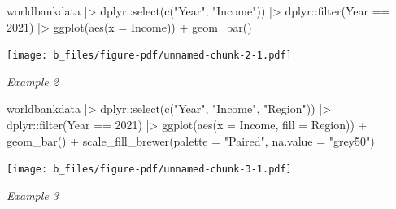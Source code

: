 \documentclass[
  letterpaper,
  DIV=11,
  numbers=noendperiod]{scrreprt}
\newenvironment{Shaded}{\begin{snugshade}}{\end{snugshade}}
\newcommand{\AttributeTok}[1]{\textcolor[rgb]{0.40,0.45,0.13}{#1}}
\newcommand{\DecValTok}[1]{\textcolor[rgb]{0.68,0.00,0.00}{#1}}
\newcommand{\FunctionTok}[1]{\textcolor[rgb]{0.28,0.35,0.67}{#1}}
\newcommand{\NormalTok}[1]{\textcolor[rgb]{0.00,0.23,0.31}{#1}}
\newcommand{\SpecialCharTok}[1]{\textcolor[rgb]{0.37,0.37,0.37}{#1}}
\newcommand{\StringTok}[1]{\textcolor[rgb]{0.13,0.47,0.30}{#1}}
\begin{document}
\begin{Shaded}
\begin{Highlighting}[]
\NormalTok{worldbankdata }\SpecialCharTok{|\textgreater{}}
\NormalTok{  dplyr}\SpecialCharTok{::}\FunctionTok{select}\NormalTok{(}\FunctionTok{c}\NormalTok{(}\StringTok{"Year"}\NormalTok{, }\StringTok{"Income"}\NormalTok{)) }\SpecialCharTok{|\textgreater{}}
\NormalTok{  dplyr}\SpecialCharTok{::}\FunctionTok{filter}\NormalTok{(Year }\SpecialCharTok{==} \DecValTok{2021}\NormalTok{) }\SpecialCharTok{|\textgreater{}}
  \FunctionTok{ggplot}\NormalTok{(}\FunctionTok{aes}\NormalTok{(}\AttributeTok{x =}\NormalTok{ Income)) }\SpecialCharTok{+}
  \FunctionTok{geom\_bar}\NormalTok{()}
\end{Highlighting}
\end{Shaded}

\texttt{[image: b\_files/figure-pdf/unnamed-chunk-2-1.pdf]}

\emph{Example 2}

\begin{Shaded}
\begin{Highlighting}[]
\NormalTok{worldbankdata }\SpecialCharTok{|\textgreater{}}
\NormalTok{  dplyr}\SpecialCharTok{::}\FunctionTok{select}\NormalTok{(}\FunctionTok{c}\NormalTok{(}\StringTok{"Year"}\NormalTok{, }\StringTok{"Income"}\NormalTok{, }\StringTok{"Region"}\NormalTok{)) }\SpecialCharTok{|\textgreater{}}
\NormalTok{  dplyr}\SpecialCharTok{::}\FunctionTok{filter}\NormalTok{(Year }\SpecialCharTok{==} \DecValTok{2021}\NormalTok{) }\SpecialCharTok{|\textgreater{}}
  \FunctionTok{ggplot}\NormalTok{(}\FunctionTok{aes}\NormalTok{(}\AttributeTok{x =}\NormalTok{ Income, }\AttributeTok{fill =}\NormalTok{ Region)) }\SpecialCharTok{+}
  \FunctionTok{geom\_bar}\NormalTok{() }\SpecialCharTok{+}
  \FunctionTok{scale\_fill\_brewer}\NormalTok{(}\AttributeTok{palette =} \StringTok{"Paired"}\NormalTok{, }\AttributeTok{na.value =} \StringTok{"grey50"}\NormalTok{)}
\end{Highlighting}
\end{Shaded}

\texttt{[image: b\_files/figure-pdf/unnamed-chunk-3-1.pdf]}

\emph{Example 3}
\end{document}

